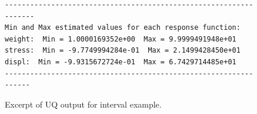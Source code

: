 \begin{figure}
\centering
\begin{bigbox}
\begin{small}
\begin{verbatim}
------------------------------------------------------------------
Min and Max estimated values for each response function:
weight:  Min = 1.0000169352e+00  Max = 9.9999491948e+01
stress:  Min = -9.7749994284e-01  Max = 2.1499428450e+01
displ:  Min = -9.9315672724e-01  Max = 6.7429714485e+01
-----------------------------------------------------------------
\end{verbatim}
\end{small}
\end{bigbox}
\caption{Excerpt of UQ output for interval example.}
\label{uq:examples:interval_out}
\end{figure}

